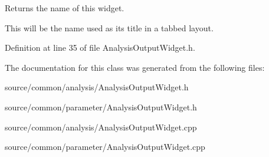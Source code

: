 Returns the name of this widget. 

This will be the name used as its title in a tabbed layout. 

Definition at line 35 of file Analysis\-Output\-Widget.\-h.



The documentation for this class was generated from the following files\-:\begin{DoxyCompactItemize}
\item 
source/common/analysis/Analysis\-Output\-Widget.\-h\item 
source/common/parameter/Analysis\-Output\-Widget.\-h\item 
source/common/analysis/Analysis\-Output\-Widget.\-cpp\item 
source/common/parameter/Analysis\-Output\-Widget.\-cpp\end{DoxyCompactItemize}
